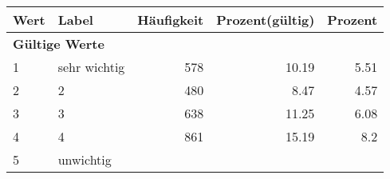      \begin{longtable}{lXrrr}
     \toprule
     \textbf{Wert} & \textbf{Label} & \textbf{Häufigkeit} & \textbf{Prozent(gültig)} & \textbf{Prozent} \\
     \endhead
     \midrule
     \multicolumn{5}{l}{\textbf{Gültige Werte}}\\

     1 &
     \multicolumn{1}{X}{ sehr wichtig   } &


       \num{578} &
       \num[round-mode=places,round-precision=2]{10,19} &
         \num[round-mode=places,round-precision=2]{5,51} \\

     2 &
     \multicolumn{1}{X}{ 2   } &


       \num{480} &
       \num[round-mode=places,round-precision=2]{8,47} &
         \num[round-mode=places,round-precision=2]{4,57} \\

     3 &
     \multicolumn{1}{X}{ 3   } &


       \num{638} &
       \num[round-mode=places,round-precision=2]{11,25} &
         \num[round-mode=places,round-precision=2]{6,08} \\

     4 &
     \multicolumn{1}{X}{ 4   } &


       \num{861} &
       \num[round-mode=places,round-precision=2]{15,19} &
         \num[round-mode=places,round-precision=2]{8,2} \\

     5 &
     \multicolumn{1}{X}{ unwichtig   } &



\end{longtable}
